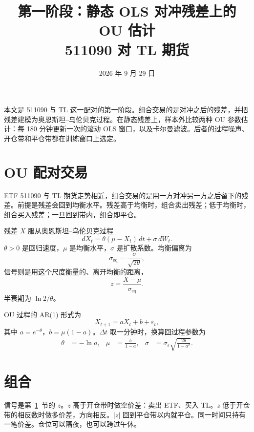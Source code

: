\documentclass[11pt,fontset=none,scheme=plain]{ctexart}
\title{第一阶段：静态 OLS 对冲残差上的 OU 估计\\[0.3em]
\large 511090 对 TL 期货}
\date{2026 年 9 月 29 日}
\begin{document}
\maketitle

本文是 511090 与 TL 这一配对的第一阶段。组合交易的是对冲之后的残差，并把残差建模为奥恩斯坦--乌伦贝克过程。在静态残差上，样本外比较两种 OU 参数估计：每 180 分钟更新一次的滚动 OLS 窗口，以及卡尔曼滤波。后者的过程噪声、开仓带和平仓带都在训练窗口上选定。

\section{OU 配对交易}
\label{sec:ou}

ETF 511090 与 TL 期货走势相近，组合交易的是用一方对冲另一方之后留下的残差。前提是残差会回到均衡水平。残差高于均衡时，组合卖出残差；低于均衡时，组合买入残差；一旦回到带内，组合即平仓。

残差 $X$ 服从奥恩斯坦--乌伦贝克过程
\begin{equation}
dX_t = \theta(\mu - X_t)\,dt + \sigma\,dW_t.
\end{equation}
$\theta > 0$ 是回归速度，$\mu$ 是均衡水平，$\sigma$ 是扩散系数。均衡偏离为
\begin{equation}
\sigma_{\mathrm{eq}} = \frac{\sigma}{\sqrt{2\theta}},
\end{equation}
信号则是用这个尺度衡量的、离开均衡的距离，
\begin{equation}
z = \frac{X - \mu}{\sigma_{\mathrm{eq}}}.
\end{equation}
半衰期为 $\ln 2 / \theta$。

OU 过程的 AR(1) 形式为
\begin{equation}
X_{t+1} = a X_t + b + \varepsilon_t,
\end{equation}
其中 $a = e^{-\theta}$，$b = \mu(1-a)$。$\Delta t$ 取一分钟时，换算回过程参数为
\begin{align}
\theta &= -\ln a, &
\mu &= \frac{b}{1-a}, &
\sigma &= \sigma_\varepsilon \sqrt{\frac{2\theta}{1-a^2}}.
\end{align}

\section{组合}

信号是第~\ref{sec:ou}~节的 $z$。$z$ 高于开仓带时做空价差：卖出 ETF、买入 TL。$z$ 低于开仓带的相反数时做多价差，方向相反。$|z|$ 回到平仓带以内就平仓。同一时间只持有一笔价差。仓位可以隔夜，也可以跨过午休。
\end{document}
